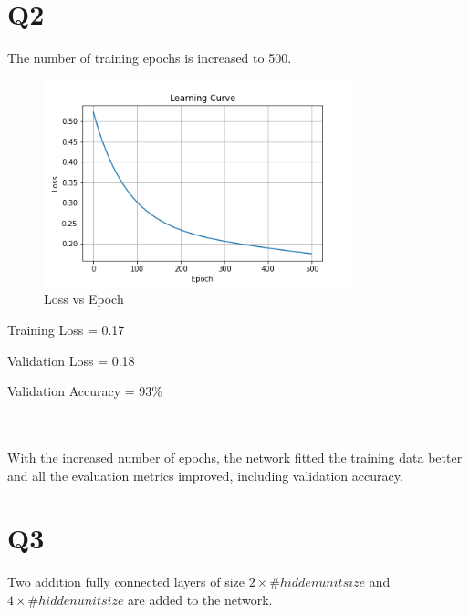 \documentclass[11pt]{extarticle}
\begin{document}
\pagebreak

\section{Q2}

The number of training epochs is increased to 500.

\begin{figure}[h]
\centering
\includegraphics[width=0.8\textwidth]{Q2.png}
\caption{Loss vs Epoch}\label{fig:Q2}
\end{figure}
\begin{minipage}{0.3\textwidth}
    Training Loss = 0.17
\end{minipage}
\begin{minipage}{0.3\textwidth}
    Validation Loss = 0.18
\end{minipage}
\begin{minipage}{0.3\textwidth}
    Validation Accuracy = 93\%
\end{minipage}
\\
\\
With the increased number of epochs, the network fitted the training data better and all the evaluation metrics improved, including validation accuracy.

\pagebreak

\section{Q3}

Two addition fully connected layers of size $2 \times \#hiddenunitsize$ and $4 \times \#hiddenunitsize$ are added to the network.
\end{document}
